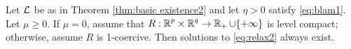 \begin{theorem}\label{thm:relaxed existence}
Let $\operatorname{\mathcal{L}}$  be as in Theorem \ref{thm:basic existence2}
and let $\eta> 0$ satisfy \eqref{eq:blam1}.
Let $\mu\ge 0$. If $\mu=0$, assume that $R:{\operatorname{\mathbb{R}}^p}\times{\operatorname{\mathbb{R}}^q}\rightarrow \operatorname{\mathbb{R}}_+\cup\{+\infty\}$
is level compact; otherwise, assume $R$
is 1-coercive.
Then solutions to \eqref{eq:relax2} always exist.
\end{theorem}
